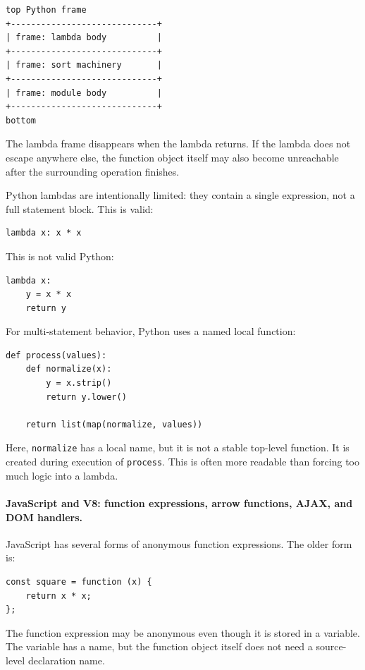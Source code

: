 \begin{verbatim}
top Python frame
+-----------------------------+
| frame: lambda body          |
+-----------------------------+
| frame: sort machinery       |
+-----------------------------+
| frame: module body          |
+-----------------------------+
bottom
\end{verbatim}

The lambda frame disappears when the lambda returns. If the lambda does not escape anywhere else, the function object itself may also become unreachable after the surrounding operation finishes.

Python lambdas are intentionally limited: they contain a single expression, not a full statement block. This is valid:

\begin{verbatim}
lambda x: x * x
\end{verbatim}

This is not valid Python:

\begin{verbatim}
lambda x:
    y = x * x
    return y
\end{verbatim}

For multi-statement behavior, Python uses a named local function:

\begin{verbatim}
def process(values):
    def normalize(x):
        y = x.strip()
        return y.lower()

    return list(map(normalize, values))
\end{verbatim}

Here, \texttt{normalize} has a local name, but it is not a stable top-level function. It is created during execution of \texttt{process}. This is often more readable than forcing too much logic into a lambda.

\paragraph{JavaScript and V8: function expressions, arrow functions, AJAX, and DOM handlers.}

JavaScript has several forms of anonymous function expressions. The older form is:

\begin{verbatim}
const square = function (x) {
    return x * x;
};
\end{verbatim}

The function expression may be anonymous even though it is stored in a variable. The variable has a name, but the function object itself does not need a source-level declaration name.

